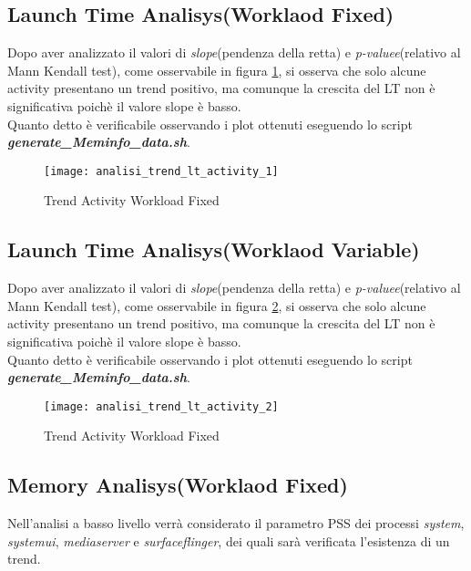 \clearpage

\subsection{Launch Time Analisys(Worklaod Fixed)}
Dopo aver analizzato il valori di \textit{slope}(pendenza della retta) e
\textit{p-valuee}(relativo al Mann Kendall test), come osservabile in figura \ref{analisi_trend_lt_activity_1},
si osserva che solo alcune activity presentano un trend positivo, ma comunque la crescita del LT non è
significativa poichè il valore slope è basso.\\
Quanto detto è verificabile osservando i plot ottenuti eseguendo lo script  \textit{\textbf{generate\_Meminfo\_data.sh}}.
\begin{figure}[!htbp]
  \centering
  \texttt{[image: analisi\_trend\_lt\_activity\_1]}
  \caption{Trend Activity Workload Fixed}
  \label{analisi_trend_lt_activity_1}
\end{figure}

\clearpage

\subsection{Launch Time Analisys(Worklaod Variable)}
Dopo aver analizzato il valori di \textit{slope}(pendenza della retta) e
\textit{p-valuee}(relativo al Mann Kendall test), come osservabile in figura \ref{analisi_trend_lt_activity_2},
si osserva che solo alcune activity presentano un trend positivo, ma comunque la crescita del LT non è
significativa poichè il valore slope è basso.\\
Quanto detto è verificabile osservando i plot ottenuti eseguendo lo script  \textit{\textbf{generate\_Meminfo\_data.sh}}.

\begin{figure}[!htbp]
  \centering
  \texttt{[image: analisi\_trend\_lt\_activity\_2]}
  \caption{Trend Activity Workload Fixed}
  \label{analisi_trend_lt_activity_2}
\end{figure}

\clearpage

\subsection{Memory Analisys(Worklaod Fixed)}

Nell'analisi a basso livello verrà considerato il parametro PSS dei processi \textit{system},
\textit{systemui}, \textit{mediaserver} e \textit{surfaceflinger}, dei quali
sarà verificata l'esistenza di un trend.\\

